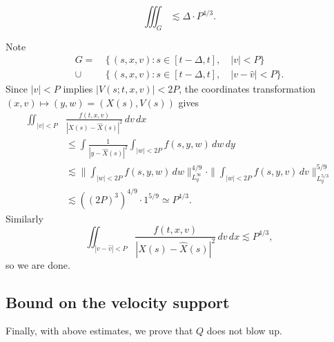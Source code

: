\documentclass[12pt]{article}
\begin{document}
\begin{prop}
\[\iiint_G\lesssim\Delta\cdot P^{4/3}.\]
\end{prop}
\begin{pf}
Note
\begin{align*}
G=\ &\{\,(s,x,v):s\in[t-\Delta,t],\quad|v|<P\}\\
\cup\ &\{\,(s,x,v):s\in[t-\Delta,t],\quad|v-\hat v|<P\}.
\end{align*}
Since $|v|<P$ implies $|V(s;t,x,v)|<2P$, the coordinates transformation $(x,v)\mapsto(y,w)=(X(s),V(s))$ gives
\begin{align*}
\iint_{|v|<P}&\frac{f(t,x,v)}{|X(s)-\hat X(s)|^2}\,dv\,dx\\
&\le\int\frac1{|y-\hat X(s)|^2}\int_{|w|<2P}f(s,y,w)\,dw\,dy\\
&\lesssim\|\int_{|w|<2P}f(s,y,w)\,dw\|_{L_y^\infty}^{4/9}\cdot\|\int_{|w|<2P}f(s,y,v)\,dv\|_{L_y^{5/3}}^{5/9}\\
&\lesssim((2P)^3)^{4/9}\cdot1^{5/9}\simeq P^{4/3}.
\end{align*}
Similarly
\[\iint_{|v-\hat v|<P}\frac{f(t,x,v)}{|X(s)-\hat X(s)|^2}\,dv\,dx\lesssim P^{4/3},\]
so we are done.
\end{pf}


\subsection{Bound on the velocity support}
Finally, with above estimates, we prove that $Q$ does not blow up.
\end{document}
